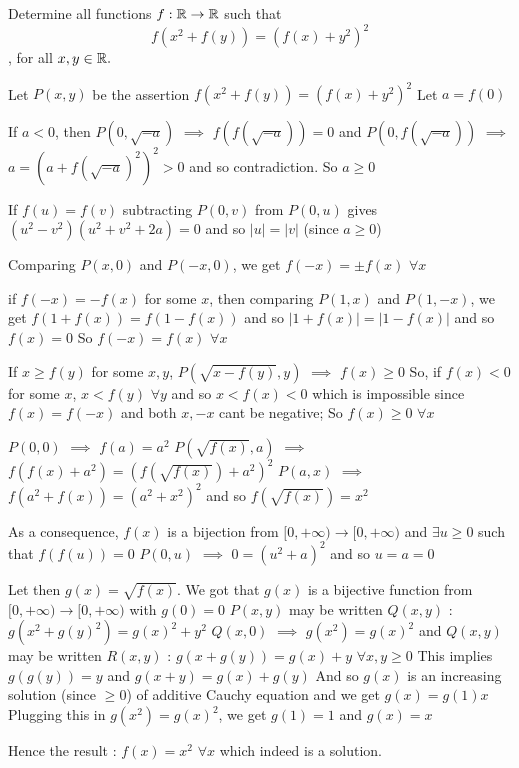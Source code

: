 \begin{solution}
	\begin{tcolorbox}Determine all functions $f:\Bbb{R}\to\Bbb{R}$ such that \[  f(x^2 + f(y)) = (f(x) + y^2)^ 2 \] , for all $x,y\in \Bbb{R}.$\end{tcolorbox}
Let $P(x,y)$ be the assertion $f(x^2+f(y))=(f(x)+y^2)^2$
Let $a=f(0)$

If $a<0$, then $P(0,\sqrt{-a})$ $\implies$ $f(f(\sqrt{-a}))=0$ and $P(0,f(\sqrt{-a}))$ $\implies$ $a=(a+f(\sqrt{-a})^2)^2>0$ and so contradiction.
So $a\ge 0$

If $f(u)=f(v)$ subtracting $P(0,v)$ from $P(0,u)$ gives $(u^2-v^2)(u^2+v^2+2a)=0$ and so $|u|=|v|$ (since $a\ge 0$)

Comparing $P(x,0)$ and $P(-x,0)$, we get $f(-x)=\pm f(x)$ $\forall x$

if $f(-x)=-f(x)$ for some $x$, then comparing $P(1,x)$ and $P(1,-x)$, we get $f(1+f(x))=f(1-f(x))$ and so $|1+f(x)|=|1-f(x)|$ and so $f(x)=0$
So $f(-x)=f(x)$ $\forall x$

If $x\ge f(y)$ for some $x,y$, $P(\sqrt{x-f(y)},y)$ $\implies$ $f(x)\ge 0$
So, if $f(x)<0$ for some $x$, $x<f(y)$ $\forall y$ and so $x<f(x)<0$ which is impossible since $f(x)=f(-x)$ and both $x,-x$ cant be negative;
So $f(x)\ge 0$ $\forall x$

$P(0,0)$ $\implies$ $f(a)=a^2$
$P(\sqrt{f(x)},a)$ $\implies$ $f(f(x)+a^2)=(f(\sqrt{f(x)})+a^2)^2$
$P(a,x)$ $\implies$ $f(a^2+f(x))=(a^2+x^2)^2$
and so $f(\sqrt{f(x)})=x^2$ 

As a consequence, $f(x)$ is a bijection from $[0,+\infty)\to[0,+\infty)$ and $\exists u\ge 0$ such that $f(f(u))=0$
$P(0,u)$ $\implies$ $0=(u^2+a)^2$ and so $u=a=0$ 

Let then $g(x)=\sqrt{f(x)}$. We got that $g(x)$ is a bijective function from $[0,+\infty)\to[0,+\infty)$ with $g(0)=0$
$P(x,y)$ may be written $Q(x,y)$ : $g(x^2+g(y)^2)=g(x)^2+y^2$
$Q(x,0)$ $\implies$ $g(x^2)=g(x)^2$ and $Q(x,y)$ may be written $R(x,y)$ : $g(x+g(y))=g(x)+y$ $\forall x,y\ge 0$
This implies $g(g(y))=y$ and $g(x+y)=g(x)+g(y)$
And so $g(x)$ is an increasing solution (since $\ge 0$) of additive Cauchy equation and we get $g(x)=g(1)x$
Plugging this in $g(x^2)=g(x)^2$, we get $g(1)=1$ and $g(x)=x$

Hence the result : $\boxed{f(x)=x^2}$ $\forall x$ which indeed is a solution.
\end{solution}



